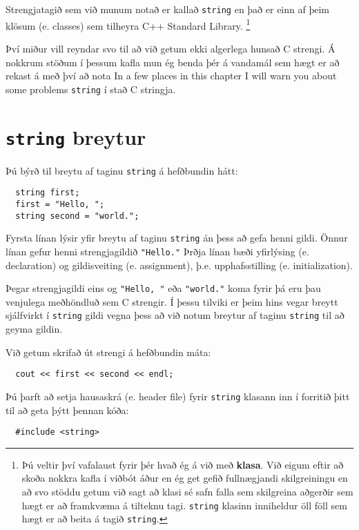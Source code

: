 Strengjatagið sem við munum notað er kallað {\tt string} en það er einn af þeim klösum (e. classes) sem tilheyra C++ Standard Library.
\footnote{Þú veltir því vafalaust fyrir þér hvað ég á við með {\bf klasa}. Við eigum eftir að skoða nokkra kafla í viðbót áður en ég get gefið fullnægjandi skilgreiningu
en að svo stöddu getum við sagt að klasi sé safn falla sem skilgreina aðgerðir sem hægt er að framkvæma á tilteknu tagi.
{\tt string} klasinn inniheldur öll föll sem hægt er að beita á tagið {\tt string}.}

Því miður vill reyndar svo til að við getum ekki algerlega hunsað C strengi.
Á nokkrum stöðum í þessum kafla mun ég benda þér á vandamál sem hægt er að rekast á með því að nota
In a few places in this chapter I will warn you about some problems {\tt string} í stað C stringja.

\section{{\tt string} breytur}

Þú býrð til breytu af taginu {\tt string} á hefðbundin hátt:

\begin{verbatim}
  string first;
  first = "Hello, ";
  string second = "world.";
\end{verbatim}
%
Fyrsta línan lýsir yfir breytu af taginu {\tt string} án þess að gefa henni gildi.
Önnur línan gefur henni strengjagildið \verb+"Hello."+
Þrðja línan bæði yfirlýsing (e. declaration) og gildisveiting (e. assignment), þ.e. upphafsstilling (e. initialization).

Þegar strengjagildi eins og \verb+"Hello, "+ eða \verb+"world."+ koma fyrir þá eru þau venjulega meðhöndluð sem C strengir.
Í þessu tilviki er þeim hins vegar breytt sjálfvirkt í {\tt string} gildi vegna þess að við notum breytur af taginu {\tt string} til að geyma gildin.

Við getum skrifað út strengi á hefðbundin máta: 

\begin{verbatim}
  cout << first << second << endl;
\end{verbatim}
%

Þú þarft að setja hausaskrá (e. header file) fyrir {\tt string} klasann inn í forritið þitt til að geta þýtt þennan kóða:
\begin{verbatim}
  #include <string>
\end{verbatim}



